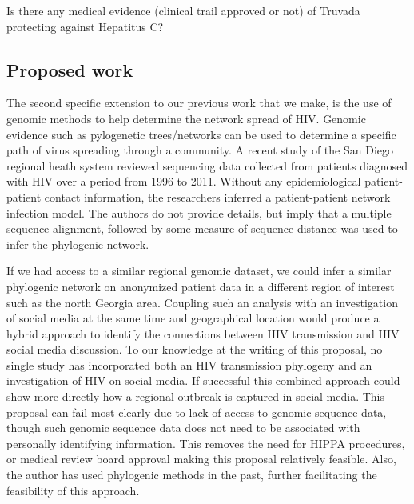 Is there any medical evidence (clinical trail approved or not) of Truvada protecting against Hepatitus C?



\subsection{Proposed work}

The second specific extension to our previous work that we make, is the use of genomic methods to help determine the network spread of HIV. Genomic evidence such as pylogenetic trees/networks can be used to determine a specific path of virus spreading through a community. A recent study of the San Diego regional heath system reviewed sequencing data collected from patients diagnosed with HIV over a period from 1996 to 2011\cite{little2014using}. Without any epidemiological patient-patient contact information, the researchers inferred a patient-patient network infection model. The authors do not provide details, but imply that a multiple sequence alignment, followed by some measure of sequence-distance was used to infer the phylogenic network.

If we had access to a similar regional genomic dataset, we could infer a similar phylogenic network on anonymized patient data in a different region of interest such as the north Georgia area. Coupling such an analysis with an investigation of social media at the same time and geographical location would produce a hybrid approach to identify the connections between HIV transmission and HIV social media discussion. To our knowledge at the writing of this proposal, no single study has incorporated both an HIV transmission phylogeny and an investigation of HIV on social media. If successful this combined approach could show more directly how a regional outbreak is captured in social media. This proposal can fail most clearly due to lack of access to genomic sequence data, though such genomic sequence data does not need to be associated with personally identifying information. This removes the need for HIPPA procedures, or medical review board approval making this proposal relatively feasible. Also, the author has used phylogenic methods in the past, further facilitating the feasibility of this approach.

